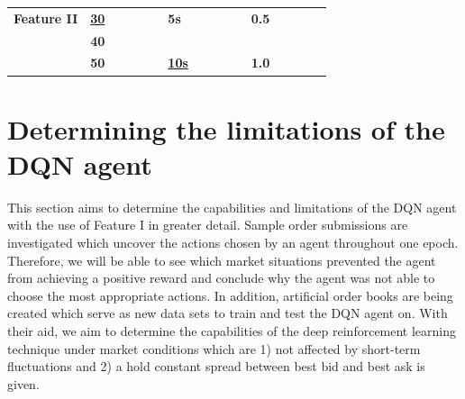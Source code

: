 \begin{table}[H]
\begin{tabular}{l|lllll|llllllllll|}
\multicolumn{1}{|l|}{\textbf{Feature II}} & \multicolumn{1}{l|}{{\ul \textbf{30}}} & \multicolumn{1}{l|}{}            & \multicolumn{1}{l|}{}            & \multicolumn{1}{l|}{}            &             & \multicolumn{1}{l|}{\textbf{5s}}        & \multicolumn{1}{l|}{}            & \multicolumn{1}{l|}{}            & \multicolumn{1}{l|}{}            & \multicolumn{1}{l|}{}            & \multicolumn{1}{l|}{\textbf{0.5}}       & \multicolumn{1}{l|}{}            & \multicolumn{1}{l|}{}            & \multicolumn{1}{l|}{}            &             \\ \cline{2-16} 
\multicolumn{1}{|l|}{\textbf{}}           & \multicolumn{1}{l|}{\textbf{40}}       & \multicolumn{1}{l|}{}            & \multicolumn{1}{l|}{}            & \multicolumn{1}{l|}{}            &             &                                         &                                  &                                  &                                  &                                  &                                         &                                  &                                  &                                  &             \\ \cline{2-16} 
\multicolumn{1}{|l|}{\textbf{}}           & \multicolumn{1}{l|}{\textbf{50}}       & \multicolumn{1}{l|}{}            & \multicolumn{1}{l|}{}            & \multicolumn{1}{l|}{}            &             & \multicolumn{1}{l|}{{\ul \textbf{10s}}} & \multicolumn{1}{l|}{}            & \multicolumn{1}{l|}{}            & \multicolumn{1}{l|}{}            & \multicolumn{1}{l|}{}            & \multicolumn{1}{l|}{\textbf{1.0}}       & \multicolumn{1}{l|}{}            & \multicolumn{1}{l|}{}            & \multicolumn{1}{l|}{}            &             \\ \hline
\end{tabular}
\end{table}

\section{Determining the limitations of the DQN agent}
\label{sec:eval-dqn-limitations}
This section aims to determine the capabilities and limitations of the DQN agent with the use of Feature I in greater detail.
Sample order submissions are investigated which uncover the actions chosen by an agent throughout one epoch.
Therefore, we will be able to see which market situations prevented the agent from achieving a positive reward and conclude why the agent was not able to choose the most appropriate actions.
In addition, artificial order books are being created which serve as new data sets to train and test the DQN agent on.
With their aid, we aim to determine the capabilities of the deep reinforcement learning technique under market conditions which are 1) not affected by short-term fluctuations and 2) a hold constant spread between best bid and best ask is given.

